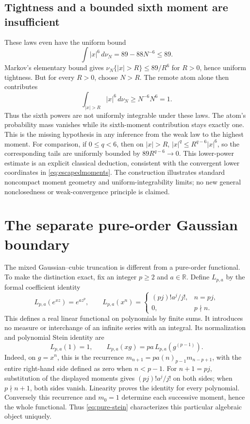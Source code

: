 \documentclass[11pt]{article}
\newcommand{\R}{\mathbb R}
\begin{document}
\subsection{Tightness and a bounded sixth moment are insufficient}
These laws even have the uniform bound
\[
 \int|x|^6\,d\nu_N=89-88N^{-6}\leq89.
\]
Markov's elementary bound gives
$\nu_N\{|x|>R\}\leq89/R^6$ for $R>0$, hence uniform
tightness. But for every $R>0$, choose $N>R$. The remote
atom alone then contributes
\[
 \int_{|x|>R}|x|^6\,d\nu_N\geq N^{-6}N^6=1.
\]
Thus the sixth powers are not uniformly integrable under these
laws. The atom's probability mass vanishes while its sixth-moment
contribution stays exactly one. This is the missing hypothesis
in any inference from the weak law to the highest moment.
For comparison, if $0\leq q<6$, then on $|x|>R$,
$|x|^q\leq R^{q-6}|x|^6$, so the corresponding tails are
uniformly bounded by $89R^{q-6}\to0$. This lower-power
estimate is an explicit classical deduction, consistent with
the convergent lower coordinates in \eqref{eq:escapedmoments}.
The construction illustrates standard noncompact moment geometry
and uniform-integrability limits; no new general nonclosedness
or weak-convergence principle is claimed.


\section{The separate pure-order Gaussian boundary}
The mixed Gaussian--cubic truncation is different from a pure-order
functional. To make the distinction exact, fix an integer $p\geq2$
and $a\in\R$. Define $L_{p,a}$ by the formal coefficient identity
\[
 L_{p,a}(e^{xz})=e^{az^p},\qquad
 L_{p,a}(x^n)=\begin{cases}(pj)!a^j/j!,&n=pj,\\0,&p\nmid n.
 \end{cases}
\]
This defines a real linear functional on polynomials by finite sums.
It introduces no measure or interchange of an infinite series with
an integral. Its normalization and polynomial Stein identity are
\begin{equation}\label{eq:pure-stein}
 L_{p,a}(1)=1,\qquad
 L_{p,a}(xg)=pa\,L_{p,a}(g^{(p-1)}).
\end{equation}
Indeed, on $g=x^n$, this is the recurrence
$m_{n+1}=pa(n)_{p-1}m_{n-p+1}$, with the entire right-hand side defined as zero when $n<p-1$.
For $n+1=pj$, substitution of the displayed moments gives
$(pj)!a^j/j!$ on both sides; when $p\nmid n+1$, both sides vanish.
Linearity proves the identity for every polynomial. Conversely this
recurrence and $m_0=1$ determine each successive moment, hence the
whole functional. Thus \eqref{eq:pure-stein} characterizes this
particular algebraic object uniquely.
\end{document}
